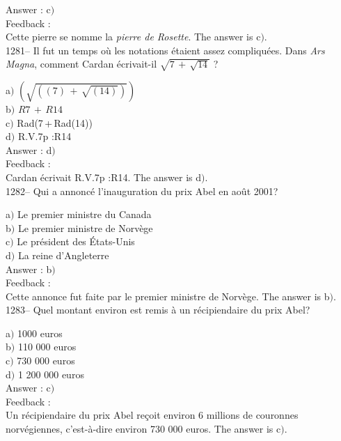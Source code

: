 \documentclass[letterpaper, 12pt]{article}
\begin{document}
Answer : c$)$\\

Feedback : \\
Cette pierre se nomme la {\sl pierre de Rosette}.
The answer is  c$)$.\\

1281-- Il fut un temps o\`u les notations \'etaient assez
compliqu\'ees. Dans {\sl Ars Magna}, comment Cardan \'ecrivait-il
$\sqrt{7\,+\,\sqrt{14}}$ ?

a$)$ $(\sqrt{((7)\,+\,\sqrt{(14)})})$ \\[2mm]
b$)$ $R7\,+\,R14$ \\[2mm]
c$)$ Rad(7\,+\,Rad(14)) \\[2mm]
d$)$ R.V.7p :R14\\

Answer : d$)$\\

Feedback : \\
Cardan \'ecrivait R.V.7p :R14.
The answer is  d$)$.\\

1282-- Qui a annonc\'e l'inauguration du prix Abel en ao\^ut 2001?

a$)$ Le premier ministre du Canada \\
b$)$ Le premier ministre de Norv\`ege \\
c$)$ Le pr\'esident des \'Etats-Unis \\
d$)$ La reine d'Angleterre\\

Answer : b$)$\\

Feedback : \\
Cette annonce fut faite par le premier ministre de Norv\`ege.
The answer is  b$)$.\\

1283-- Quel montant environ est remis \`a un r\'ecipiendaire du prix
Abel?

a$)$ 1000 euros \\
b$)$ 110 000 euros \\
c$)$ 730 000 euros \\
d$)$ 1 200 000 euros\\

Answer : c$)$\\

Feedback : \\
Un r\'ecipiendaire du prix Abel re\c coit environ 6 millions de
couronnes norv\'egiennes,  c'est-\`a-dire environ 730 000 euros.
The answer is  c$)$.\\
\end{document}
